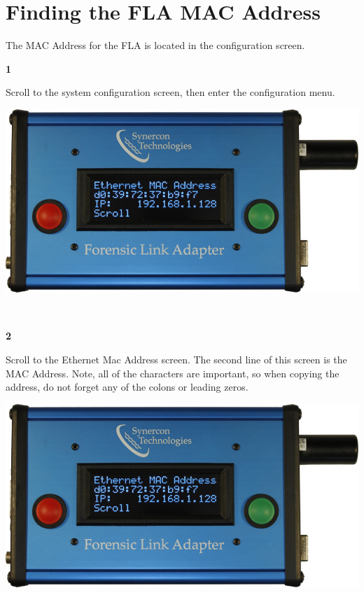 \documentclass[11pt, oneside]{book}
\begin{document}
\section{Finding the FLA MAC Address}
\label{subsec:finding_mac}
The MAC Address for the FLA is located in the configuration screen.
\\[\baselineskip]
\noindent\begin{minipage}{0.45\textwidth}%
\begin{center}
\textbf{1}\\[\baselineskip]
\end{center}
Scroll to the system configuration screen, then enter the configuration menu.
\end{minipage}%
\hfill%
\begin{minipage}{0.45\textwidth}
\includegraphics[width=\linewidth]{../media/fla_screens/ethernet_and_others/sys_conf/mac}
\end{minipage}
\\[\baselineskip]
\noindent\begin{minipage}{0.45\textwidth}%
\begin{center}
\textbf{2}\\[\baselineskip]
\end{center}
Scroll to the Ethernet Mac Address screen. The second line of this screen is the MAC Address. Note, all of the characters are important, so when copying the address, do not forget any of the colons or leading zeros.
\end{minipage}%
\hfill%
\begin{minipage}{0.45\textwidth}
\includegraphics[width=\linewidth]{../media/fla_screens/ethernet_and_others/sys_conf/mac}
\end{minipage}
\\
\end{document}
